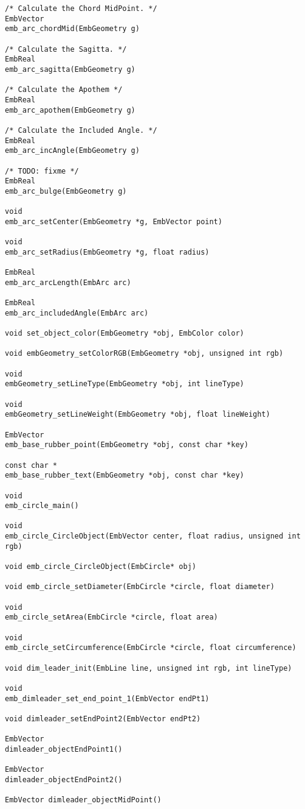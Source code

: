 \begin{lstlisting}
/* Calculate the Chord MidPoint. */
EmbVector
emb_arc_chordMid(EmbGeometry g)

/* Calculate the Sagitta. */
EmbReal
emb_arc_sagitta(EmbGeometry g)

/* Calculate the Apothem */
EmbReal
emb_arc_apothem(EmbGeometry g)

/* Calculate the Included Angle. */
EmbReal
emb_arc_incAngle(EmbGeometry g)

/* TODO: fixme */
EmbReal
emb_arc_bulge(EmbGeometry g)

void
emb_arc_setCenter(EmbGeometry *g, EmbVector point)

void
emb_arc_setRadius(EmbGeometry *g, float radius)

EmbReal
emb_arc_arcLength(EmbArc arc)

EmbReal
emb_arc_includedAngle(EmbArc arc)

void set_object_color(EmbGeometry *obj, EmbColor color)

void embGeometry_setColorRGB(EmbGeometry *obj, unsigned int rgb)

void
embGeometry_setLineType(EmbGeometry *obj, int lineType)

void
embGeometry_setLineWeight(EmbGeometry *obj, float lineWeight)

EmbVector
emb_base_rubber_point(EmbGeometry *obj, const char *key)

const char *
emb_base_rubber_text(EmbGeometry *obj, const char *key)

void
emb_circle_main()

void
emb_circle_CircleObject(EmbVector center, float radius, unsigned int rgb)

void emb_circle_CircleObject(EmbCircle* obj)

void emb_circle_setDiameter(EmbCircle *circle, float diameter)

void
emb_circle_setArea(EmbCircle *circle, float area)

void
emb_circle_setCircumference(EmbCircle *circle, float circumference)

void dim_leader_init(EmbLine line, unsigned int rgb, int lineType)

void
emb_dimleader_set_end_point_1(EmbVector endPt1)

void dimleader_setEndPoint2(EmbVector endPt2)

EmbVector
dimleader_objectEndPoint1()

EmbVector
dimleader_objectEndPoint2()

EmbVector dimleader_objectMidPoint()


\end{lstlisting}
